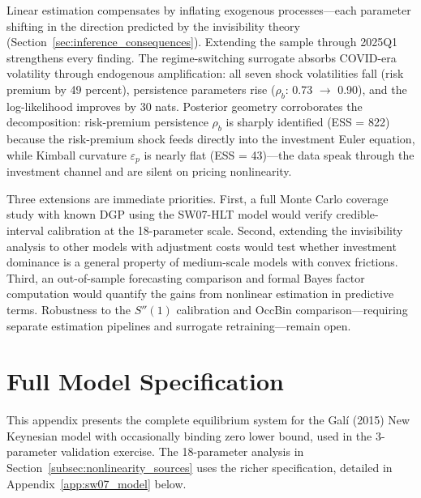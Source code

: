 \documentclass[12pt]{article}
\theoremstyle{plain}
\theoremstyle{definition}
\theoremstyle{remark}
\begin{document}
Linear estimation compensates by inflating exogenous processes---each parameter shifting in the direction predicted by the invisibility theory (Section~\ref{sec:inference_consequences}). Extending the sample through 2025Q1 strengthens every finding. The regime-switching surrogate absorbs COVID-era volatility through endogenous amplification: all seven shock volatilities fall (risk premium by 49 percent), persistence parameters rise ($\rho_b$: 0.73 $\to$ 0.90), and the log-likelihood improves by 30 nats. Posterior geometry corroborates the decomposition: risk-premium persistence $\rho_b$ is sharply identified (ESS = 822) because the risk-premium shock feeds directly into the investment Euler equation, while Kimball curvature $\varepsilon_p$ is nearly flat (ESS = 43)---the data speak through the investment channel and are silent on pricing nonlinearity.

Three extensions are immediate priorities. First, a full Monte Carlo coverage study with known DGP using the SW07-HLT model would verify credible-interval calibration at the 18-parameter scale. Second, extending the invisibility analysis to other models with adjustment costs \citep[e.g.,][]{christiano2005nominal,justiniano2010investment} would test whether investment dominance is a general property of medium-scale models with convex frictions. Third, an out-of-sample forecasting comparison and formal Bayes factor computation would quantify the gains from nonlinear estimation in predictive terms. Robustness to the $S''(1)$ calibration and OccBin comparison---requiring separate estimation pipelines and surrogate retraining---remain open.


\pagebreak



\pagebreak

\appendix

\section{Full Model Specification}
\label{app:model}

This appendix presents the complete equilibrium system for the Gal\'i (2015) New Keynesian model with occasionally binding zero lower bound, used in the 3-parameter validation exercise. The 18-parameter analysis in Section~\ref{subsec:nonlinearity_sources} uses the richer \citet{smets2007shocks} specification, detailed in Appendix~\ref{app:sw07_model} below.
\end{document}
